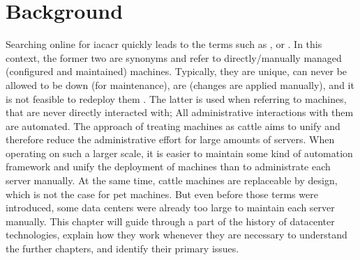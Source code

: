 \chapter{Background}




Searching online for \gls{iacacr} quickly leads to the terms such as ,  or . \cite{snowflake_servers}
In this context, the former two are synonyms and refer to directly/manually managed (configured and maintained) machines. Typically, they are unique, can never be allowed to be down (for maintenance), are  (changes are applied manually), and it is not feasible to redeploy them \cite{pets_vs_cattle}. The latter is used when referring to machines, that are never directly interacted with; All administrative interactions with them are automated.
The approach of treating machines as cattle aims to unify and therefore reduce the administrative effort for large amounts of servers. When operating on such a larger scale, it is easier to maintain some kind of automation framework and unify the deployment of machines than to administrate each server manually. At the same time, cattle machines are replaceable by design, which is not the case for pet machines.
But even before those terms were introduced, some data centers were already too large to maintain each server manually.
This chapter will guide through a part of the history of datacenter technologies, explain how they work whenever they are necessary to understand the further chapters, and identify their primary issues.


